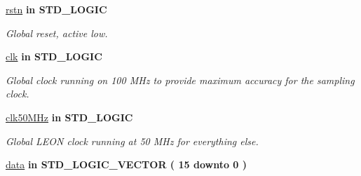  \begin{DoxyCompactItemize}
\item 
\hypertarget{classdacTop_aba021aec4b477b89079bb58ccadcc67e}{\hyperlink{classdacTop_aba021aec4b477b89079bb58ccadcc67e}{rstn}  {\bfseries {\bfseries \textcolor{vhdlkeyword}{in}\textcolor{vhdlchar}{ }}} {\bfseries \textcolor{comment}{S\-T\-D\-\_\-\-L\-O\-G\-I\-C}\textcolor{vhdlchar}{ }} }\label{classdacTop_aba021aec4b477b89079bb58ccadcc67e}

\begin{DoxyCompactList}\small\item\em Global reset, active low. \end{DoxyCompactList}\item 
\hypertarget{classdacTop_a8120037e0ee47c35ba2d79242209c72e}{\hyperlink{classdacTop_a8120037e0ee47c35ba2d79242209c72e}{clk}  {\bfseries {\bfseries \textcolor{vhdlkeyword}{in}\textcolor{vhdlchar}{ }}} {\bfseries \textcolor{comment}{S\-T\-D\-\_\-\-L\-O\-G\-I\-C}\textcolor{vhdlchar}{ }} }\label{classdacTop_a8120037e0ee47c35ba2d79242209c72e}

\begin{DoxyCompactList}\small\item\em Global clock running on 100 M\-Hz to provide maximum accuracy for the sampling clock. \end{DoxyCompactList}\item 
\hypertarget{classdacTop_a4f305185694168405a38c701331c178e}{\hyperlink{classdacTop_a4f305185694168405a38c701331c178e}{clk50\-M\-Hz}  {\bfseries {\bfseries \textcolor{vhdlkeyword}{in}\textcolor{vhdlchar}{ }}} {\bfseries \textcolor{comment}{S\-T\-D\-\_\-\-L\-O\-G\-I\-C}\textcolor{vhdlchar}{ }} }\label{classdacTop_a4f305185694168405a38c701331c178e}

\begin{DoxyCompactList}\small\item\em Global L\-E\-O\-N clock running at 50 M\-Hz for everything else. \end{DoxyCompactList}\item 
\hypertarget{classdacTop_a2cc65ad6f0f6d24cd3ebac8757953224}{\hyperlink{classdacTop_a2cc65ad6f0f6d24cd3ebac8757953224}{data}  {\bfseries {\bfseries \textcolor{vhdlkeyword}{in}\textcolor{vhdlchar}{ }}} {\bfseries \textcolor{comment}{S\-T\-D\-\_\-\-L\-O\-G\-I\-C\-\_\-\-V\-E\-C\-T\-O\-R}\textcolor{vhdlchar}{ }\textcolor{vhdlchar}{(}\textcolor{vhdlchar}{ }\textcolor{vhdlchar}{ } \textcolor{vhdldigit}{15} \textcolor{vhdlchar}{ }\textcolor{vhdlchar}{ }\textcolor{vhdlchar}{ }\textcolor{vhdlkeyword}{downto}\textcolor{vhdlchar}{ }\textcolor{vhdlchar}{ }\textcolor{vhdlchar}{ } \textcolor{vhdldigit}{0} \textcolor{vhdlchar}{ }\textcolor{vhdlchar}{)}\textcolor{vhdlchar}{ }} }\label{classdacTop_a2cc65ad6f0f6d24cd3ebac8757953224}


\end{DoxyCompactItemize}
